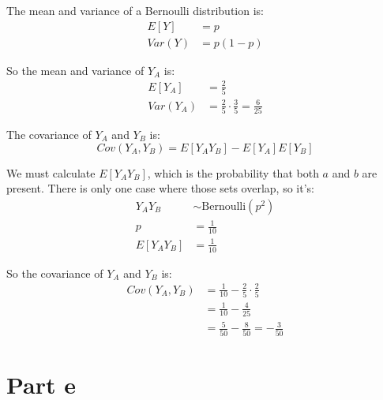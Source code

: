 The mean and variance of a Bernoulli distribution is:
\begin{align*}
	E[Y]   & = p      \\
	Var(Y) & = p(1-p)
\end{align*}

So the mean and variance of $Y_A$ is:
\begin{align*}
	E[Y_A]   & = \frac{2}{5}                                  \\
	Var(Y_A) & = \frac{2}{5} \cdot \frac{3}{5} = \frac{6}{25}
\end{align*}

The covariance of $Y_A$ and $Y_B$ is:
\[
	Cov(Y_A, Y_B) = E[Y_AY_B] - E[Y_A]E[Y_B]
\]

We must calculate $E[Y_AY_B]$, which is the probability that both $a$ and $b$ are present. There is only one case where those sets overlap, so it's:
\begin{align*}
	Y_AY_B    & \sim \text{Bernoulli}(p^2) \\
	p         & = \frac{1}{10}             \\
	E[Y_AY_B] & = \frac{1}{10}
\end{align*}

So the covariance of $Y_A$ and $Y_B$ is:
\begin{align*}
	Cov(Y_A, Y_B) & = \frac{1}{10} - \frac{2}{5} \cdot \frac{2}{5} \\
	              & = \frac{1}{10} - \frac{4}{25}                  \\
	              & = \frac{5}{50} - \frac{8}{50} = -\frac{3}{50}
\end{align*}

\section{Part e}

